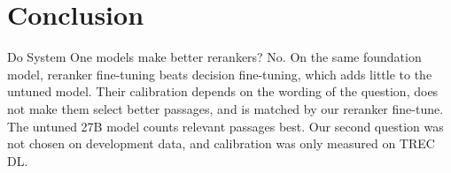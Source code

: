 \section{Conclusion}
\label{sec:conclusion}

Do System One models make better rerankers? No. On the same foundation model, reranker fine-tuning beats decision
fine-tuning, which adds little to the untuned model. Their calibration depends on the wording of the question, does
not make them select better passages, and is matched by our reranker fine-tune. The untuned 27B model counts
relevant passages best.
Our second question was not chosen on development data, and calibration was only measured on TREC DL.
